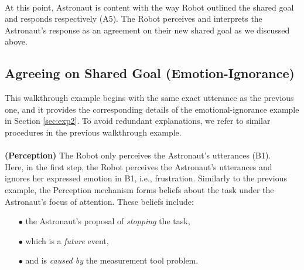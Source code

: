 \noindent{}\\

At this point, Astronaut is content with the way Robot outlined the shared goal
and responds respectively (A5). The Robot perceives and interprets the
Astronaut's response as an agreement on their new shared goal as we discussed
above.\\

\noindent{}

\subsection{Agreeing on Shared Goal (Emotion-Ignorance)}
\label{sec:wt-exp2}

This walkthrough example begins with the same exact utterance as the previous
one, and it provides the corresponding details of the emotional-ignorance
example in Section \ref{sec:exp2}. To avoid redundant explanations, we refer to
similar procedures in the previous walkthrough example.\\

\noindent{}\\

\noindent\textbf{(Perception)} The Robot only perceives the Astronaut's
utterances (B1).\\

Here, in the first step, the Robot perceives the Astronaut's utterances and
ignores her expressed emotion in B1, i.e., frustration. Similarly to the
previous example, the Perception mechanism forms beliefs about the task under
the Astronaut's focus of attention. These beliefs include:

\begin{itemize}
  \item[$\bullet$] the Astronaut's proposal of \textit{stopping} the task,
  \item[$\bullet$] which is a \textit{future} event,
  \item[$\bullet$] and is \textit{caused by} the measurement tool problem.
\end{itemize}

